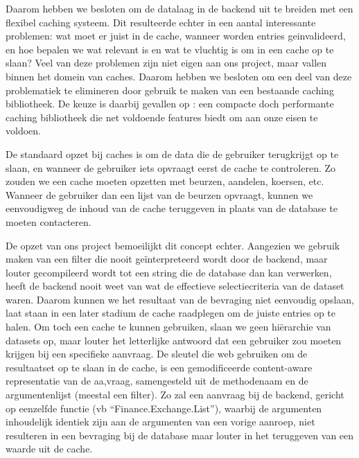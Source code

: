 Daarom hebben we besloten om de datalaag in de backend uit te breiden met een flexibel caching systeem. Dit resulteerde echter in een aantal interessante problemen: wat moet er juist in de cache, wanneer worden entries geinvalideerd, en hoe bepalen we wat relevant is en wat te vluchtig is om in een cache op te slaan? Veel van deze problemen zijn niet eigen aan ons project, maar vallen binnen het domein van caches. Daarom hebben we besloten om een deel van deze problematiek te elimineren door gebruik te maken van een bestaande caching bibliotheek. De keuze is daarbij gevallen op : een compacte doch performante caching bibliotheek die net voldoende features biedt om aan onze eisen te voldoen.

De standaard opzet bij caches is om de data die de gebruiker terugkrijgt op te slaan, en wanneer de gebruiker iets opvraagt eerst de cache te controleren. Zo zouden we een cache moeten opzetten met beurzen, aandelen, koersen, etc. Wanneer de gebruiker dan een lijst van de beurzen opvraagt, kunnen we eenvoudigweg de inhoud van de cache teruggeven in plaats van de database te moeten contacteren.

De opzet van ons project bemoeilijkt dit concept echter. Aangezien we gebruik maken van een filter die nooit ge\"interpreteerd wordt door de backend, maar louter gecompileerd wordt tot een string die de database dan kan verwerken, heeft de backend nooit weet van wat de effectieve selectiecriteria van de dataset waren. Daarom kunnen we het resultaat van de bevraging niet eenvoudig opslaan, laat staan in een later stadium de cache raadplegen om de juiste entries op te halen.
Om toch een cache te kunnen gebruiken, slaan we geen hi\"erarchie van datasets op, maar louter het letterlijke antwoord dat een gebruiker zou moeten krijgen bij een specifieke aanvraag. De sleutel die web gebruiken om de resultaatset op te slaan in de cache, is een gemodificeerde content-aware representatie van de aa,vraag, samengesteld uit de methodenaam en de argumentenlijst (meestal een filter). Zo zal een aanvraag bij de backend, gericht op eenzelfde functie (vb ``Finance.Exchange.List''), waarbij de argumenten inhoudelijk identiek zijn aan de argumenten van een vorige aanroep, niet resulteren in een bevraging bij de database maar louter in het teruggeven van een waarde uit de cache.


